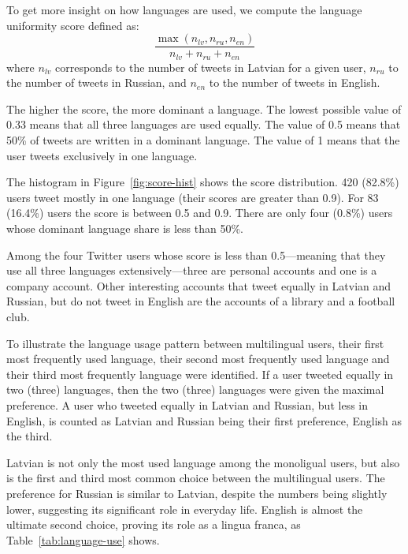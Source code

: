 \documentclass[11pt,a4paper]{article}
\begin{document}
To get more insight on how languages are used, we compute the language uniformity score defined as:
\begin{equation}
  \label{eq:score}
  \frac{\max(n_\mathit{lv}, n_\mathit{ru}, n_\mathit{en})}{n_\mathit{lv} + n_\mathit{ru} + n_\mathit{en}}
\end{equation}
where $n_\mathit{lv}$ corresponds to the number of tweets in Latvian for a given user, $n_\mathit{ru}$ to the number of tweets in Russian, and $n_\mathit{en}$ to the number of tweets in English.

The higher the score, the more dominant a language. The lowest possible value of 0.33 means that all three languages are used equally. The value of 0.5 means that 50\% of tweets are written in a dominant language. The value of 1 means that the user tweets exclusively in one language.

The histogram in Figure~\ref{fig:score-hist} shows the score distribution. 420 (82.8\%) users tweet mostly in one language (their scores are greater than 0.9). For 83  (16.4\%) users the score is between 0.5 and 0.9. There are only four (0.8\%) users whose dominant language share is less than 50\%.

Among the four Twitter users whose score is less than 0.5---meaning that they use all three languages extensively---three are personal accounts and one is a company account. Other interesting accounts that tweet equally in Latvian and Russian, but do not tweet in English are the accounts of a library and a football club.

To illustrate the language usage pattern between multilingual users, their first most frequently used language, their second most frequently used language and their third most frequently language were identified. If a user tweeted equally in two (three) languages, then the two (three) languages were given the maximal preference. A user who tweeted equally in Latvian and Russian, but less in English, is counted as Latvian and Russian being their first preference, English as the third.

Latvian is not only the most used language among the monoligual users, but also is the first and third most common choice between the multilingual users. The preference for Russian is similar to Latvian, despite the numbers being slightly lower, suggesting its significant role in everyday life. English is almost the ultimate second choice, proving its role as a lingua franca, as Table~\ref{tab:language-use} shows.
%

\end{document}
